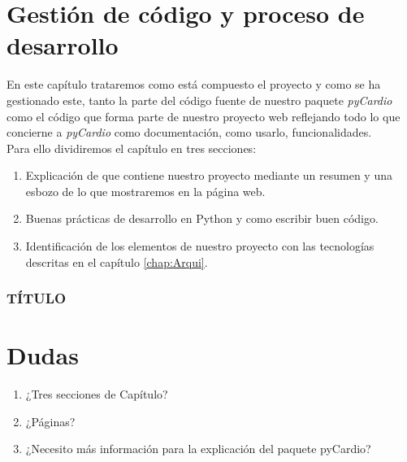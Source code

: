 \documentclass[a4paper, 12pt]{book}
\begin{document}
\chapter{Gestión de código y proceso de desarrollo}
\label{chap:codeManagement}

En este capítulo trataremos como está compuesto el proyecto y como se ha gestionado este, tanto la parte del código fuente de nuestro paquete \emph{pyCardio} como el código que forma parte de nuestro proyecto web reflejando todo lo que concierne a \emph{pyCardio} como documentación, como usarlo, funcionalidades. \\
Para ello dividiremos el capítulo en tres secciones:
\begin{enumerate}
    \item Explicación de que contiene nuestro proyecto mediante un resumen y una esbozo de lo que mostraremos en la página web.
    \item Buenas prácticas de desarrollo en Python y como escribir buen código.
    \item Identificación de los elementos de nuestro proyecto con las tecnologías descritas en el capítulo \ref{chap:Arqui}.
\end{enumerate}

\subsection{TÍTULO}
\label{subsec:explainContent}



\chapter*{Dudas}
\begin{enumerate}
    \item ¿Tres secciones de Capítulo?
    \item ¿Páginas?
    \item ¿Necesito más información para la explicación del paquete pyCardio?
\end{enumerate}
\end{document}

